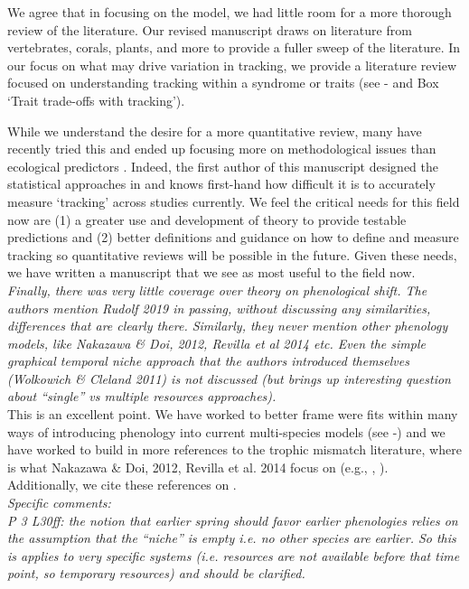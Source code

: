 \documentclass[11pt]{article}
\begin{document}
We agree that in focusing on the model, we had little room for a more thorough review of the literature. Our revised manuscript draws on literature from vertebrates, corals, plants, and more to provide a fuller sweep of the literature. In our focus on what may drive variation in tracking, we provide a literature review focused on understanding tracking within a syndrome or traits (see - and Box `Trait trade-offs with tracking'). 

While we understand the desire for a more quantitative review, many have recently tried this and ended up focusing more on methodological issues than ecological predictors \citep[][]{brown2016,kharouba2018}. Indeed, the first author of this manuscript designed the statistical approaches in \citet{kharouba2018} and knows first-hand how difficult it is to accurately measure `tracking' across studies currently. We feel the critical needs for this field now are (1) a greater use and development of theory to provide testable predictions and (2) better definitions and guidance on how to define and measure tracking so quantitative reviews will be possible in the future. Given these needs, we have written a manuscript that we see as most useful to the field now. \\ 

\emph{Finally, there was very little coverage over theory on phenological shift. The authors
mention Rudolf 2019 in passing, without discussing any similarities, differences that are
clearly there. Similarly, they never mention other phenology models, like Nakazawa \& Doi,
2012, Revilla et al 2014 etc. Even the simple graphical temporal niche approach that the
authors introduced themselves (Wolkowich \& Cleland 2011) is not discussed (but brings up
interesting question about ``single'' vs multiple resources approaches).}\\

This is an excellent point. We have worked to better frame were \citet{volkerass} fits within many ways of introducing phenology into current multi-species models (see -) and we have worked to build in more references to the trophic mismatch literature, where is what Nakazawa \& Doi, 2012, Revilla et al. 2014 focus on (e.g., , ). Additionally, we cite these references on .\\

\emph{Specific comments:\\
P 3 L30ff: the notion that earlier spring should favor earlier phenologies relies on the
assumption that the ``niche'' is empty i.e. no other species are earlier. So this is applies to
very specific systems (i.e. resources are not available before that time point, so temporary
resources) and should be clarified.}\\
\end{document}
